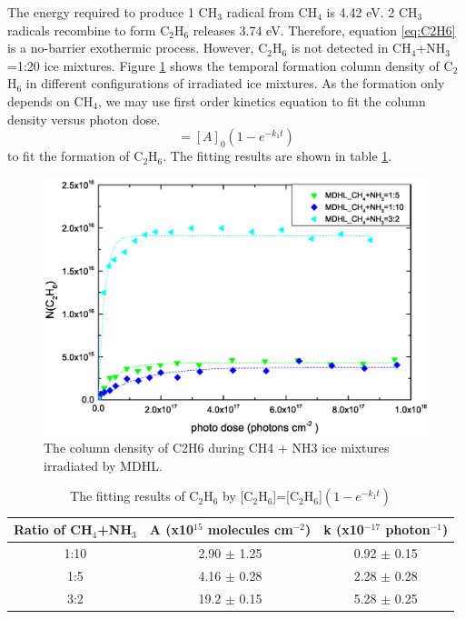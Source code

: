 The energy required to produce 1 CH$_3$ radical from CH$_4$ is 4.42 eV. 2 CH$_3$ radicals recombine to form C$_2$H$_6$ releases 3.74 eV. Therefore, equation \ref{eq:C2H6} is a no-barrier exothermic process. However, C$_2$H$_6$ is not detected in CH$_4$+NH$_3$=1:20 ice mixtures. Figure \ref{fig:lab_C2H6} shows the temporal formation column density of C$_2$H$_6$ in different configurations of irradiated ice mixtures.  As the formation only depends on CH$_4$, we may use first order kinetics equation to fit the column density versus photon dose.
\begin{equation}
[A] = [A]_0(1 - e^{-k_1 t})
\label{eq:1step}
\end{equation}
to fit the formation of C$_2$H$_6$. The fitting results are shown in table \ref{tab:fittingC2H6}.

\begin{figure}
\centering
\includegraphics[width=\textwidth]{figures/chapter3/Lab_C2H6.eps}
\caption{The column density of C2H6 during CH4 + NH3 ice mixtures irradiated by MDHL. }
\label{fig:lab_C2H6}
\end{figure}

\begin{table}[htbp]
\caption{The fitting results of C$_2$H$_6$ by [C$_2$H$_6$]=[C$_2$H$_6$]$(1 - e^{-k_1 t})$}
\label{tab:fittingC2H6}
\begin{tabular}{ccc}
\hline
\hline
Ratio of CH$_4$+NH$_3$ & A (x10$^{15}$ molecules cm$^{-2}$) & k (x10$^{-17}$ photon$^{-1}$) \\
\hline
1:10 & 2.90 $\pm$ 1.25 & 0.92 $\pm$ 0.15 \\
1:5 & 4.16 $\pm$ 0.28 & 2.28 $\pm$ 0.28 \\
3:2 & 19.2 $\pm$ 0.15 & 5.28 $\pm$ 0.25 \\
\hline
\end{tabular}
\end{table}


